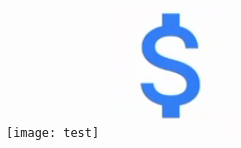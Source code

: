 \documentclass[c]{beamer}
\begin{document}
\begin{frame}
\begin{figure}[ht]
{\begin{minipage}[t]{71.5pt}
\begin{center}
     \end{center}
  \end{minipage}}
  \hfill
  {\begin{minipage}[t]{98.8pt}
  \begin{center}
    \texttt{[image: test]}
     \includegraphics[scale=.4]{images/18d.png}\newline
     \end{center}
  \end{minipage}}
\end{figure}
	\end{frame}
\end{document}
